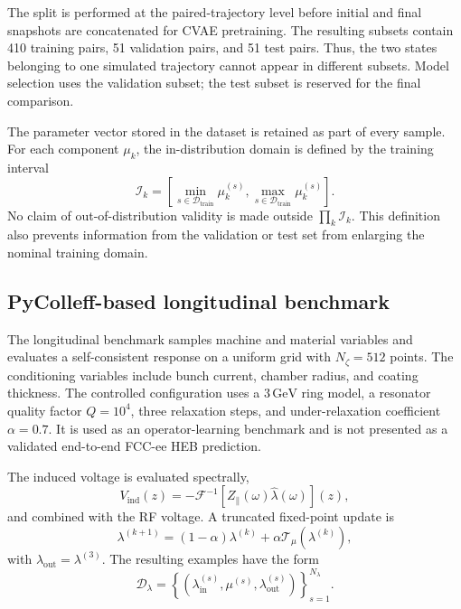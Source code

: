 The split is performed at the paired-trajectory level before initial and final snapshots are concatenated for CVAE pretraining. The resulting subsets contain 410 training pairs, 51 validation pairs, and 51 test pairs. Thus, the two states belonging to one simulated trajectory cannot appear in different subsets. Model selection uses the validation subset; the test subset is reserved for the final comparison.

The parameter vector stored in the dataset is retained as part of every sample. For each component $\mu_k$, the in-distribution domain is defined by the training interval
\begin{equation}
    \mathcal{I}_k
    =
    \left[
        \min_{s\in\mathcal{D}_{\mathrm{train}}}\mu_k^{(s)},
        \max_{s\in\mathcal{D}_{\mathrm{train}}}\mu_k^{(s)}
    \right].
    \label{eq:training_parameter_domain}
\end{equation}
No claim of out-of-distribution validity is made outside $\prod_k\mathcal{I}_k$. This definition also prevents information from the validation or test set from enlarging the nominal training domain.

\subsection{PyColleff-based longitudinal benchmark}

The longitudinal benchmark samples machine and material variables and evaluates a self-consistent response on a uniform grid with $N_{\zeta}=512$ points. The conditioning variables include bunch current, chamber radius, and coating thickness. The controlled configuration uses a $3\,\mathrm{GeV}$ ring model, a resonator quality factor $Q=10^{4}$, three relaxation steps, and under-relaxation coefficient $\alpha=0.7$. It is used as an operator-learning benchmark and is not presented as a validated end-to-end FCC-ee HEB prediction.

The induced voltage is evaluated spectrally,
\begin{equation}
    V_{\mathrm{ind}}(z)
    =
    -\mathcal{F}^{-1}
    \left[
        Z_{\parallel}(\omega)\widehat{\lambda}(\omega)
    \right](z),
    \label{eq:induced_voltage_revised}
\end{equation}
and combined with the RF voltage. A truncated fixed-point update is
\begin{equation}
    \lambda^{(k+1)}
    =
    (1-\alpha)\lambda^{(k)}
    +
    \alpha\mathcal{T}_{\mu}\!\left(\lambda^{(k)}\right),
    \label{eq:pycolleff_relaxation_revised}
\end{equation}
with $\lambda_{\mathrm{out}}=\lambda^{(3)}$. The resulting examples have the form
\begin{equation}
    \mathcal{D}_{\lambda}
    =
    \left\{
        \left(
            \lambda_{\mathrm{in}}^{(s)},
            \mu^{(s)},
            \lambda_{\mathrm{out}}^{(s)}
        \right)
    \right\}_{s=1}^{N_{\lambda}}.
\end{equation}


